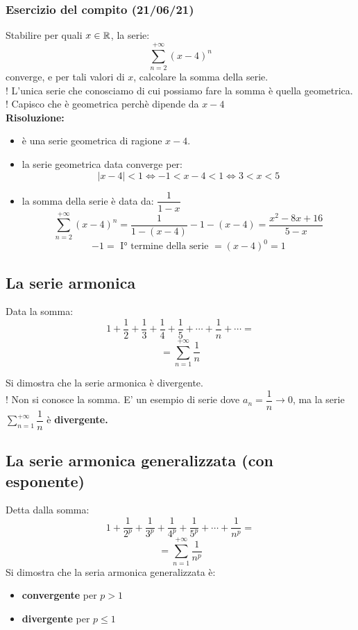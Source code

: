 \documentclass[../main.tex]{subfiles}
\begin{document}
\subsubsection{Esercizio del compito (21/06/21)}
Stabilire per quali $x\in \mathbb{R}$, la serie:
\[
    \sum_{n=2}^{+\infty}(x-4)^n
\]
converge, e per tali valori di $x$, calcolare la somma della serie.\\ ! L'unica
serie che conosciamo di cui possiamo fare la somma è quella geometrica.\\ !
Capisco che è geometrica perchè dipende da $x-4$\\ \textbf{Risoluzione:}\\
\begin{itemize}
    \item è una serie geometrica di ragione $x-4$.
    \item la serie geometrica data converge per:
          \[
              |x-4|<1 \iff -1<x-4<1 \iff 3<x<5
          \]
    \item la somma della serie è data da: $\dfrac{1}{1-x}$
          \[
              \sum_{n=2}^{+\infty}(x-4)^n = \dfrac{1}{1-(x-4)} - 1 - (x-4) = \dfrac{x^2-8x+16}{5-x}
          \]
          \[
              -1 = \text{ I° termine della serie } = {(x-4)}^0 = 1
          \]
\end{itemize}

\subsection{La serie armonica}
Data la somma:
\[
    1+\dfrac{1}{2} + \dfrac{1}{3} + \dfrac{1}{4} + \dfrac{1}{5} + \cdots + \dfrac{1}{n} + \cdots = \]
\[
    = \sum_{n=1}^{+\infty} \dfrac{1}{n}\]

Si dimostra che la serie armonica è divergente.\\ ! Non si conosce la somma.
 E' un esempio di serie dove $a_n = \dfrac{1}{n} \to
    0$, ma la serie $\sum_{n=1}^{+\infty}\dfrac{1}{n}$ è \textbf{divergente.}

\subsection{La serie armonica generalizzata (con esponente)}
Detta dalla somma:
\[
    1+\dfrac{1}{2^p} + \dfrac{1}{3^p} + \dfrac{1}{4^p} + \dfrac{1}{5^p} + \cdots + \dfrac{1}{n^p} = \]
\[
    = \sum_{n=1}^{+\infty} \dfrac{1}{n^p}\]
Si dimostra che la seria armonica generalizzata è:
\begin{itemize}
    \item \textbf{convergente} per $p>1$
    \item \textbf{divergente} per $p\leq 1$
\end{itemize}
\end{document}
